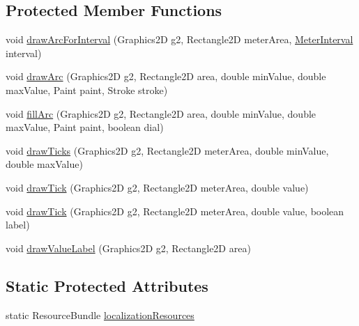 \subsection*{Protected Member Functions}
\begin{DoxyCompactItemize}
\item 
void \mbox{\hyperlink{classorg_1_1jfree_1_1chart_1_1plot_1_1_meter_plot_a1f5cb2a8dfa931c9088ed306c4f5bc5c}{draw\+Arc\+For\+Interval}} (Graphics2D g2, Rectangle2D meter\+Area, \mbox{\hyperlink{classorg_1_1jfree_1_1chart_1_1plot_1_1_meter_interval}{Meter\+Interval}} interval)
\item 
void \mbox{\hyperlink{classorg_1_1jfree_1_1chart_1_1plot_1_1_meter_plot_a13e2e1b640791be448e3f0a771653815}{draw\+Arc}} (Graphics2D g2, Rectangle2D area, double min\+Value, double max\+Value, Paint paint, Stroke stroke)
\item 
void \mbox{\hyperlink{classorg_1_1jfree_1_1chart_1_1plot_1_1_meter_plot_aae9fcfe588d1bebae4d0f01fd42d38c0}{fill\+Arc}} (Graphics2D g2, Rectangle2D area, double min\+Value, double max\+Value, Paint paint, boolean dial)
\item 
void \mbox{\hyperlink{classorg_1_1jfree_1_1chart_1_1plot_1_1_meter_plot_add824eb3971e4f3fdbc14e40b9d49911}{draw\+Ticks}} (Graphics2D g2, Rectangle2D meter\+Area, double min\+Value, double max\+Value)
\item 
void \mbox{\hyperlink{classorg_1_1jfree_1_1chart_1_1plot_1_1_meter_plot_ac8ddca6bb54b2f76362b3048c13ca2c9}{draw\+Tick}} (Graphics2D g2, Rectangle2D meter\+Area, double value)
\item 
void \mbox{\hyperlink{classorg_1_1jfree_1_1chart_1_1plot_1_1_meter_plot_ab5cffa5380573ee6641dfe1caf1a6634}{draw\+Tick}} (Graphics2D g2, Rectangle2D meter\+Area, double value, boolean label)
\item 
void \mbox{\hyperlink{classorg_1_1jfree_1_1chart_1_1plot_1_1_meter_plot_a82595c9d6120593a7b568ab21d85bbfa}{draw\+Value\+Label}} (Graphics2D g2, Rectangle2D area)
\end{DoxyCompactItemize}
\subsection*{Static Protected Attributes}
\begin{DoxyCompactItemize}
\item 
static Resource\+Bundle \mbox{\hyperlink{classorg_1_1jfree_1_1chart_1_1plot_1_1_meter_plot_a60480a227e1bd8b165313c1a2f6f8c52}{localization\+Resources}}
\end{DoxyCompactItemize}

